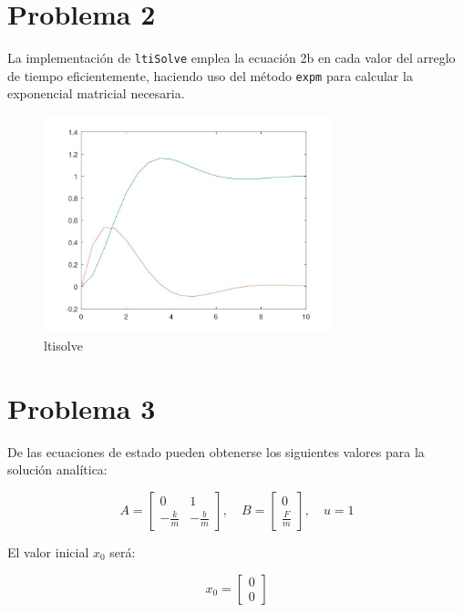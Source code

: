 \documentclass[a4paper,12pt]{article}
\begin{document}
\section*{Problema 2}

La implementación de \texttt{ltiSolve} emplea la ecuación 2b en cada valor del arreglo de tiempo eficientemente, haciendo uso del método \texttt{expm} para calcular la exponencial matricial necesaria.

\begin{figure}[H]
\centering
\includegraphics[width=0.75\textwidth]{img/ej2.jpeg}
\caption{ltisolve}
\end{figure}

\section*{Problema 3}

De las ecuaciones de estado pueden obtenerse los siguientes valores para la solución analítica:

\[
A = \begin{bmatrix}
0 & 1 \\
-\frac{k}{m} & -\frac{b}{m}
\end{bmatrix}, \quad
B = \begin{bmatrix}
0 \\
\frac{F}{m}
\end{bmatrix}, \quad
u = 1
\]

El valor inicial \( x_0 \) será:

\[
x_0 = \begin{bmatrix}
0 \\
0
\end{bmatrix}
\]
\end{document}
